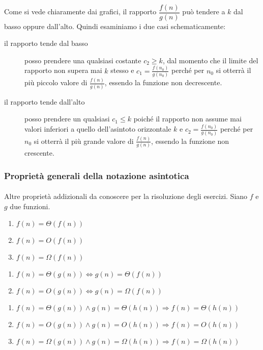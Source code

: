 \documentclass[11pt,a4paper,oneside]{article}
\begin{document}
\paragraph*{}Come si vede chiaramente dai grafici, il rapporto $\dfrac{f(n)}{g(n)}$ può tendere a $k$ dal basso oppure dall'alto. Quindi esaminiamo i due casi schematicamente:
\begin{description}
	\item[il rapporto tende dal basso] posso prendere una qualsiasi costante $c_2 \geq k$, dal momento che il limite del rapporto non supera mai $k$ stesso e $c_1 = \frac{f(n_0)}{g(n_0)}$ perché per $n_0$ si otterrà il più piccolo valore di $\frac{f(n)}{g(n)}$, essendo la funzione non decrescente.
	\item[il rapporto tende dall'alto] posso prendere un qualsiasi $c_1 \leq k$ poiché il rapporto non assume mai valori inferiori a quello dell'asintoto orizzontale $k$ e $c_2 = \frac{f(n_0)}{g(n_0)}$ perché per $n_0$ si otterrà il più grande valore di $\frac{f(n)}{g(n)}$, essendo la funzione non crescente.
\end{description}
\subsubsection{Proprietà generali della notazione asintotica}
\paragraph*{} Altre proprietà addizionali da conoscere per la risoluzione degli esercizi. Siano $f$ e $g$ due funzioni.
\begin{multicols}{3}
	\begin{enumerate}[series=qa,label=(\textit{\alph*})]
		\item $f(n) = \Theta(f(n))$
		\item $f(n) = O(f(n))$
		\item $f(n) = \Omega(f(n))$
	\end{enumerate}
\end{multicols}
\begin{multicols}{2}
	\begin{enumerate}[resume*=qa,label=(\textit{\alph*})]
		\item $f(n) = \Theta(g(n)) \Leftrightarrow g(n) = \Theta(f(n))$
		\item $f(n) = O(g(n)) \Leftrightarrow g(n) = \Omega(f(n))$ \label{itm:not1}
	\end{enumerate}
\end{multicols}
	\begin{enumerate}[resume*=qa,label=(\textit{\alph*})]
		\item $f(n) = \Theta(g(n)) \wedge g(n) = \Theta(h(n)) \Rightarrow f(n) = \Theta(h(n))$
		\item $f(n) = O(g(n)) \wedge g(n) = O(h(n)) \Rightarrow f(n) = O(h(n))$ \label{itm:not2}
		\item $f(n) = \Omega(g(n)) \wedge g(n) = \Omega(h(n)) \Rightarrow f(n) = \Omega(h(n))$
	\end{enumerate}
\end{document}
